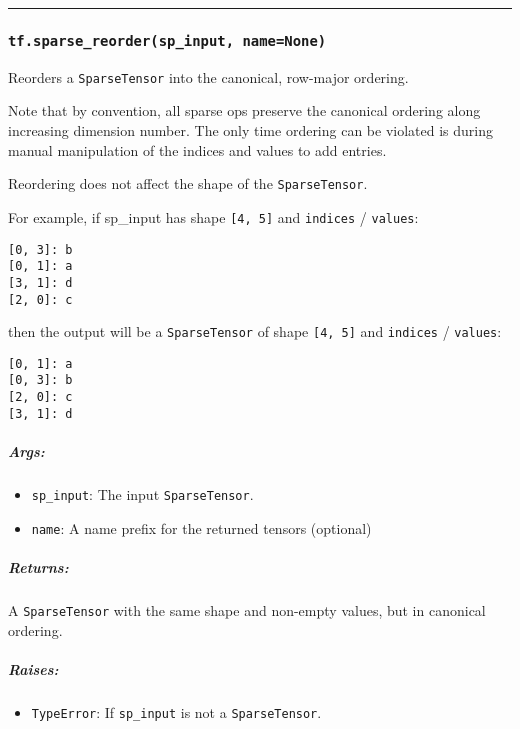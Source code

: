 \begin{center}\rule{0.5\linewidth}{\linethickness}\end{center}

\subsubsection{\texorpdfstring{\texttt{tf.sparse\_reorder(sp\_input,\ name=None)}
}{tf.sparse\_reorder(sp\_input, name=None) }}\label{tf.sparseux5freorderspux5finput-namenone}

Reorders a \texttt{SparseTensor} into the canonical, row-major ordering.

Note that by convention, all sparse ops preserve the canonical ordering
along increasing dimension number. The only time ordering can be
violated is during manual manipulation of the indices and values to add
entries.

Reordering does not affect the shape of the \texttt{SparseTensor}.

For example, if sp\_input has shape \texttt{{[}4,\ 5{]}} and
\texttt{indices} / \texttt{values}:

\begin{verbatim}
[0, 3]: b
[0, 1]: a
[3, 1]: d
[2, 0]: c
\end{verbatim}

then the output will be a \texttt{SparseTensor} of shape
\texttt{{[}4,\ 5{]}} and \texttt{indices} / \texttt{values}:

\begin{verbatim}
[0, 1]: a
[0, 3]: b
[2, 0]: c
[3, 1]: d
\end{verbatim}

\subparagraph{Args: }\label{args-5}

\begin{itemize}
\tightlist
\item
  \texttt{sp\_input}: The input \texttt{SparseTensor}.
\item
  \texttt{name}: A name prefix for the returned tensors (optional)
\end{itemize}

\subparagraph{Returns: }\label{returns-7}

A \texttt{SparseTensor} with the same shape and non-empty values, but in
canonical ordering.

\subparagraph{Raises: }\label{raises-3}

\begin{itemize}
\tightlist
\item
  \texttt{TypeError}: If \texttt{sp\_input} is not a
  \texttt{SparseTensor}.
\end{itemize}

